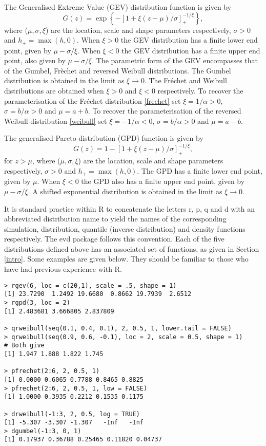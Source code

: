 \documentclass[11pt,a4paper]{article}
\begin{document}
The Generalised Extreme Value (GEV) distribution function is given by
\begin{equation}
G(z) = \exp \left\{ - \left[ 1+ \xi \left( z-\mu \right) /\sigma  \right]_{+}^{-1/\xi} \right\},
\label{gev}
\end{equation}   
where ($\mu,\sigma,\xi$) are the location, scale and shape parameters respectively, $\sigma > 0$ and $h_{+}=\max(h,0)$.
When $\xi>0$ the GEV distribution has a finite lower end point, given by $\mu - \sigma/\xi$.
When $\xi<0$ the GEV distribution has a finite upper end point, also given by $\mu - \sigma/\xi$. 
The parametric form of the GEV encompasses that of the Gumbel, Fr\`{e}chet and reversed Weibull distributions. 
The Gumbel distribution is obtained in the limit as $\xi\rightarrow0$.
The Fr\'{e}chet and Weibull distributions are obtained when $\xi>0$ and $\xi<0$ respectively. 
To recover the parameterisation of the Fr\'{e}chet distribution \eqref{frechet} set $\xi=1/\alpha>0$, $\sigma=b/\alpha>0$ and $\mu=a+b$.
To recover the parameterisation of the reversed Weibull distribution \eqref{weibull} set $\xi=-1/\alpha<0$, $\sigma=b/\alpha>0$ and $\mu=a-b$.

The generalised Pareto distribution (GPD) function is given by
\begin{equation*}
G(z) = 1 - \left[1 + \xi \left( z-\mu \right) /\sigma  \right]_{+}^{-1/\xi},
\end{equation*}   
for $z > \mu$, where ($\mu,\sigma,\xi$) are the location, scale and shape parameters respectively, $\sigma > 0$ and $h_{+}=\max(h,0)$.
The GPD has a finite lower end point, given by $\mu$.
When $\xi<0$ the GPD also has a finite upper end point, given by $\mu - \sigma/\xi$.
A shifted exponential distribution is obtained in the limit as $\xi\rightarrow0$.

It is standard practice within R to concatenate the letters r, p, q and d with an abbreviated distribution name to yield the names of the corresponding simulation, distribution, quantile (inverse distribution) and density functions respectively.
The evd package follows this convention.
Each of the five distributions defined above has an associated set of functions, as given in Section \ref{intro}. Some examples are given below.
They should be familiar to those who have had previous experience with R.

\begin{verbatim}
> rgev(6, loc = c(20,1), scale = .5, shape = 1)
[1] 23.7290  1.2492 19.6680  0.8662 19.7939  2.6512
> rgpd(3, loc = 2)
[1] 2.483681 3.666805 2.837809

> qrweibull(seq(0.1, 0.4, 0.1), 2, 0.5, 1, lower.tail = FALSE)
> qrweibull(seq(0.9, 0.6, -0.1), loc = 2, scale = 0.5, shape = 1)
# Both give
[1] 1.947 1.888 1.822 1.745

> pfrechet(2:6, 2, 0.5, 1)
[1] 0.0000 0.6065 0.7788 0.8465 0.8825
> pfrechet(2:6, 2, 0.5, 1, low = FALSE)
[1] 1.0000 0.3935 0.2212 0.1535 0.1175

> drweibull(-1:3, 2, 0.5, log = TRUE)
[1] -5.307 -3.307 -1.307   -Inf   -Inf
> dgumbel(-1:3, 0, 1)
[1] 0.17937 0.36788 0.25465 0.11820 0.04737
\end{verbatim}
\end{document}
